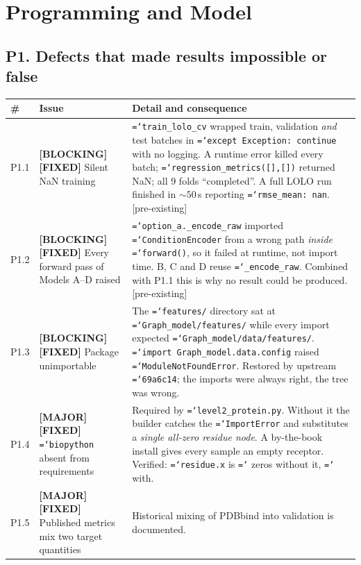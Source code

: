 \documentclass[11pt,a4paper]{article}
\newcommand{\ok}[1]{\textcolor{okgreen}{#1}}
\newcommand{\bad}[1]{\textcolor{badred}{#1}}
\newcommand{\warn}[1]{\textcolor{warnamber}{#1}}
\newcommand{\code}[1]{\texttt{\small\hyphenchar\font=`\-\relax #1}}
\newcommand{\SBLOCK}{\bad{\textbf{[BLOCKING]}}}
\newcommand{\SMAJOR}{\warn{\textbf{[MAJOR]}}}
\newcommand{\SFIXED}{\ok{\textbf{[FIXED]}}}
\begin{document}
\section{Programming and Model}

\subsection{P1. Defects that made results impossible or false}

\begin{longtable}{@{}L{0.6cm}L{5.2cm}L{8.6cm}@{}}
\toprule
\textbf{\#} & \textbf{Issue} & \textbf{Detail and consequence} \\
\midrule
\endhead
P1.1 & \SBLOCK{} \SFIXED{} Silent NaN training &
  \code{train\_lolo\_cv} wrapped train, validation \emph{and} test batches in
  \code{except Exception: continue} with no logging. A runtime error killed
  every batch; \code{regression\_metrics([],[])} returned NaN; all 9 folds
  ``completed''. A full LOLO run finished in ${\sim}50$\,s reporting
  \code{rmse\_mean: nan}. [pre-existing] \\
P1.2 & \SBLOCK{} \SFIXED{} Every forward pass of Models A--D raised &
  \code{option\_a.\_encode\_raw} imported \code{ConditionEncoder} from a wrong
  path \emph{inside} \code{forward()}, so it failed at runtime, not import
  time. B, C and D reuse \code{\_encode\_raw}. Combined with P1.1 this is why
  no result could be produced. [pre-existing] \\
P1.3 & \SBLOCK{} \SFIXED{} Package unimportable &
  The \code{features/} directory sat at \code{Graph\_model/features/} while
  every import expected \code{Graph\_model/data/features/}. \code{import
  Graph\_model.data.config} raised \code{ModuleNotFoundError}. Restored by
  upstream \code{69a6c14}; the imports were always right, the tree was wrong. \\
P1.4 & \SMAJOR{} \SFIXED{} \code{biopython} absent from requirements &
  Required by \code{level2\_protein.py}. Without it the builder catches the
  \code{ImportError} and substitutes a \emph{single all-zero residue node}.
  A by-the-book install gives every sample an empty receptor. Verified:
  \code{residue.x} is \code{[1,30]} zeros without it, \code{[30,30]} with. \\
P1.5 & \SMAJOR{} \SFIXED{} Published metrics mix two target quantities &
  Historical mixing of PDBbind into validation is documented.

\end{longtable}
\end{document}
